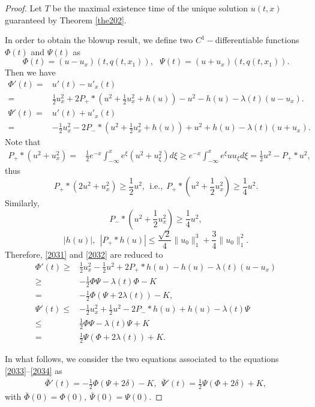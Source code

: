 \documentclass[preprint,12pt]{elsarticle}
\numberwithin{equation}{section}
\begin{document}
\begin{proof}
Let $T$ be the maximal existence time of the unique solution $u(t,x)$ guaranteed by Theorem \ref{the202}.

In order to obtain the blowup result, we define two $C^{1}-$differentiable functions $\Phi(t)$ and $\Psi(t)$ as
$$\Phi(t)=(u-u_{x})(t,q(t,x_{1})),\ \ \ \Psi(t)=(u+u_{x})(t,q(t,x_{1})).$$
Then we have
\begin{align}
\Phi'(t)=&u'(t)-u'_{x}(t)\nonumber\\
=&\frac{1}{2}u_{x}^{2}+2P_{+}\ast\left(u^{2}+\frac{1}{2}u_{x}^{2}+h(u)\right)-u^{2}-h(u)-\lambda(t) (u-u_{x}).\label{2031}
\\
\Psi'(t)=&u'(t)+u'_{x}(t)\nonumber\\
=&-\frac{1}{2}u_{x}^{2}-2P_{-}\ast\left(u^{2}+\frac{1}{2}u_{x}^{2}+h(u)\right)+u^{2}+h(u)-\lambda(t) (u+u_{x}).
\label{2032}
\end{align}
Note that
\begin{align*}
P_{+}\ast\left(u^{2}+u_{x}^{2}\right)=&\frac{1}{2}e^{-x}\int_{-\infty}^{x}e^{\xi}\left(u^{2}+u_{\xi}^{2}\right)d\xi
\geq e^{-x}\int_{-\infty}^{x}e^{\xi}uu_{\xi}d\xi
=\frac{1}{2}u^{2}-P_{+}\ast u^{2},
\end{align*}
thus
$$P_{+}\ast\left(2u^{2}+u_{x}^{2}\right)\geq \frac{1}{2}u^{2},\ \ \text{i.e.,}\ \ P_{+}\ast\left(u^{2}+\frac{1}{2}u_{x}^{2}\right)\geq \frac{1}{4}u^{2}.$$
Similarly,
 $$P_{-}\ast\left(u^{2}+\frac{1}{2}u_{x}^{2}\right)\geq \frac{1}{4}u^{2},$$
$$|h(u)|,\ \ |P_{+}\ast h(u)|\leq\frac{\sqrt{2}}{4}\|u_{0}\|_{1}^{3}+\frac{3}{4}\|u_{0}\|_{1}^{2}.$$
Therefore, \eqref{2031} and \eqref{2032} are reduced to
\begin{align}
\Phi'(t)\geq &\frac{1}{2}u_{x}^{2}-\frac{1}{2}u^{2}+2P_{+}\ast h(u)-h(u)-\lambda(t) (u-u_{x})\nonumber\\
\geq&-\frac{1}{2}\Phi \Psi-\lambda(t)\Phi-K\nonumber\\
=&-\frac{1}{2}\Phi(\Psi+2\lambda(t))-K,\label{2033}
\\
\Psi'(t)\leq&-\frac{1}{2}u_{x}^{2}+\frac{1}{2}u^{2}-2P_{-}\ast h(u)+h(u)-\lambda(t)\Psi\nonumber\\
\leq&\frac{1}{2}\Phi \Psi-\lambda(t)\Psi+K\nonumber\\
=&\frac{1}{2}\Psi(\Phi+2\lambda(t))+K.\label{2034}
\end{align}

In what follows, we consider the two equations associated to the equations \eqref{2033}--\eqref{2034} as
\begin{align}
\bar{\Phi}'(t)=-\frac{1}{2}\Phi(\Psi+2\delta)-K,\ \
\bar{\Psi}'(t)=\frac{1}{2}\Psi(\Phi+2\delta)+K,
\label{2035}
\end{align}
with $\bar{\Phi}(0)=\Phi(0),\ \bar{\Psi}(0)=\Psi(0)$.


\end{proof}
\end{document}

